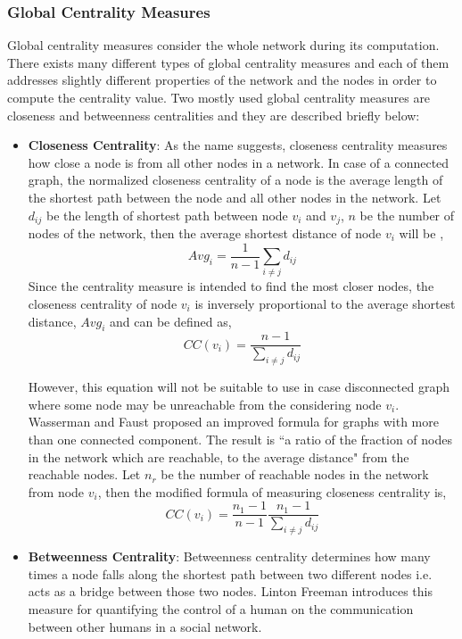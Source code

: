 \documentclass[sigconf]{acmart}
\begin{document}
\subsubsection{Global Centrality Measures}
Global centrality measures consider the whole network during its computation. There exists many different types of global centrality measures and each of them addresses slightly different properties of the network and the nodes in order to compute the centrality value. Two mostly used global centrality measures are closeness and betweenness centralities and they are described briefly below:
\begin{itemize}
	\item \textbf{Closeness Centrality}:
	As the name suggests, closeness centrality measures how close a node is from all other nodes in a network. In case of a connected graph, the normalized closeness centrality of a node is the average length of the shortest path between the node and all other nodes in the network. Let $d_{ij}$ be the length of shortest path between node $v_i$ and $v_j$, $n$ be the number of nodes of the network, then the average shortest distance of node $v_i$ will be \cite{sabidussi1966centrality},
	\begin{equation}
	Avg_i = \dfrac{1}{n-1} \sum_{i \neq j}d_{ij}
	\label{average shortest distance equation}
	\end{equation}
	Since the centrality measure is intended to find the most closer nodes, the closeness centrality of node $v_i$ is inversely proportional to the average shortest distance, $Avg_i$ and can be defined as,
	\begin{equation}
	CC(v_i) = \dfrac{n-1}{\sum_{i \neq j}d_{ij}}
	\label{closeness centrality eq}
	\end{equation} 
	
	However, this equation will not be suitable to use in case disconnected graph where some node may be unreachable from the considering node $v_i$. Wasserman and Faust \cite{opsahl2010node} proposed an improved formula for graphs with
	more than one connected component. The result is ``a ratio of the
	fraction of nodes in the network which are reachable, to the average
	distance" from the reachable nodes. Let $n_r$ be the number of reachable nodes in the network from node $v_i$, then the modified formula of measuring closeness centrality is,
	\begin{equation}
	CC(v_i) = \dfrac{n_1-1}{n-1} \dfrac{n_1-1}{\sum_{i \neq j}d_{ij}}
	\label{closeness centrality eq modified}
	\end{equation}  
	\item \textbf{Betweenness Centrality}:
	Betweenness centrality determines how many times a node falls along the shortest path between two different nodes i.e. acts as a bridge between those two nodes. 
	Linton Freeman \cite{freeman1977set} introduces this measure for quantifying the control of a human on the communication between other humans in a social network. 
	

\end{itemize}
\end{document}
